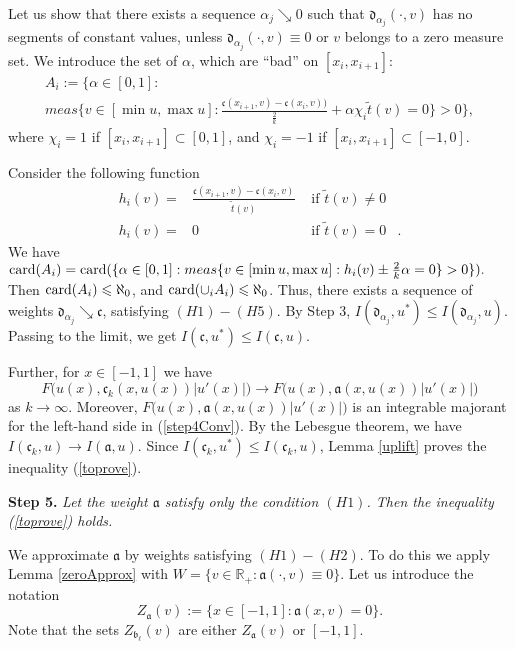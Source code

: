 \documentclass[12pt]{article}
\newcommand{\Real}{\mathbb R}
\renewcommand{\le}{\leqslant}
\newcommand{\card}{{\rm card}}
\begin{document}
Let us show that there exists a sequence $\alpha_j \searrow 0$
such that $\mathfrak d_{\alpha_j}(\cdot, v)$ has no segments of constant values,
unless $\mathfrak d_{\alpha_j}(\cdot, v) \equiv 0$ or $v$ belongs to a zero measure set.
We introduce the set of $\alpha$, which are ``bad'' on $[x_i, x_{i + 1}]$:
\begin{multline*}
A_i := \big \{\alpha \in [0, 1]: \\
meas \{v \in [\min u, \max u]: \frac{\mathfrak c(x_{i + 1}, v) - \mathfrak c(x_i, v))}{\frac{2}{k}} + \alpha \chi_i \tilde{t} (v) = 0 \} > 0 \big \},
\end{multline*}
where $\chi_i = 1$ if $[x_i, x_{i + 1}] \subset [0, 1]$, and $\chi_i = -1$ if $[x_i, x_{i + 1}] \subset [-1, 0]$.

Consider the following function
$$
\begin{aligned}
h_i(v) = & \frac{\mathfrak c(x_{i + 1}, v) - \mathfrak c(x_i, v)}{\tilde{t} (v)} & \text{ if } \tilde{t} (v) \neq 0 & \\
h_i(v) = & 0 & \text{ if } \tilde{t} (v) = 0 &.
\end{aligned}
$$
We have $\card(A_i) = \card(\{ \alpha \in [0, 1]: meas \{ v \in [\min u, \max u]: h_i(v) \pm \frac{2}{k} \alpha = 0 \} > 0 \}).$
Then $\card(A_i) \le \aleph_0$, and $\card(\cup_i A_i) \le \aleph_0$.
Thus, there exists a sequence of weights $\mathfrak d_{\alpha_j} \searrow \mathfrak c$, satisfying $(H1)-(H5)$.
By Step 3, $I(\mathfrak d_{\alpha_j}, u^*) \le I(\mathfrak d_{\alpha_j}, u)$.
Passing to the limit, we get $I(\mathfrak c, u^*) \le I(\mathfrak c, u)$.

Further, for $x \in [-1, 1]$ we have
\begin{equation}
\label{step4Conv}
F\big(u(x), \mathfrak c_k(x, u(x)) |u'(x)|\big) \to F\big(u(x), \mathfrak a(x, u(x)) |u'(x)|\big)
\end{equation}
as $k \to \infty$.
Moreover, $F\big(u(x), \mathfrak a(x, u(x)) |u'(x)|\big)$ is an integrable majorant
for the left-hand side in (\ref{step4Conv}).
By the Lebesgue theorem, we have $I(\mathfrak c_k, u) \to I(\mathfrak a, u)$.
Since $I(\mathfrak c_k, u^*) \le I(\mathfrak c_k, u)$, Lemma \ref{uplift} proves the inequality (\ref{toprove}).

\bigskip
{\bf Step 5.} {\it Let the weight $\mathfrak a$ satisfy only the condition $(H1)$.
Then the inequality (\ref{toprove}) holds.}

We approximate $\mathfrak a$ by weights satisfying $(H1)-(H2)$.
To do this we apply Lemma \ref{zeroApprox} with $W = \{ v \in \Real_+: \mathfrak a(\cdot, v) \equiv 0 \}$.
Let us introduce the notation $$Z_{\mathfrak a}(v) := \{ x \in [-1, 1]: \mathfrak a(x, v) = 0 \}.$$
Note that the sets $Z_{\mathfrak b_{\ell}}(v)$ are either $Z_{\mathfrak a}(v)$ or $[-1, 1]$.
\end{document}
